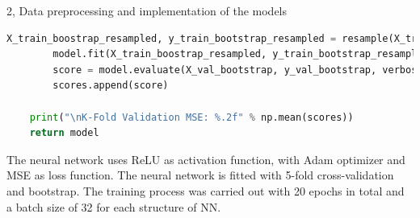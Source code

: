 \documentclass[10pt,a4paper]{article}
\begin{document}
\begin{task}{2, Data preprocessing and implementation of the models}
\begin{lstlisting}[language=Python]
        X_train_boostrap_resampled, y_train_bootstrap_resampled = resample(X_train_bootstrap, y_train_bootstrap)
        model.fit(X_train_boostrap_resampled, y_train_bootstrap_resampled, epochs=int(epochs/n_splits), batch_size=32, verbose=2)
        score = model.evaluate(X_val_bootstrap, y_val_bootstrap, verbose=0)
        scores.append(score)
        
    print("\nK-Fold Validation MSE: %.2f" % np.mean(scores))
    return model
\end{lstlisting}

The neural network uses ReLU as activation function, with Adam optimizer and MSE as loss function. The neural network is fitted with 5-fold cross-validation and bootstrap. The training process was carried out with 20 epochs in total and a batch size of 32 for each structure of NN. 
\end{task}
\newpage
\end{document}
